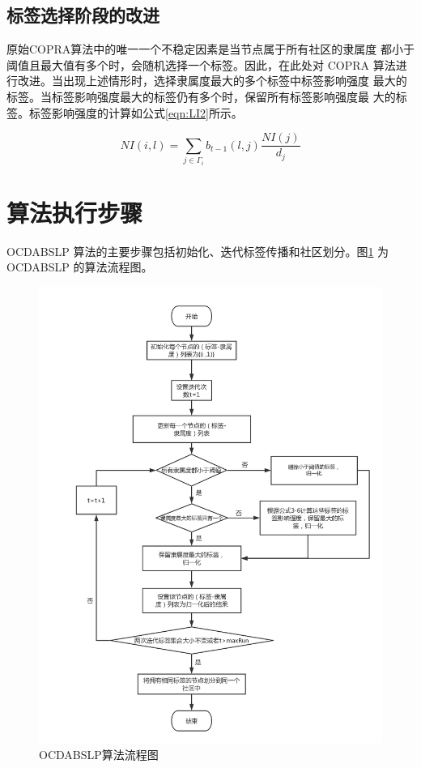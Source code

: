 \subsection{标签选择阶段的改进}
原始COPRA算法中的唯一一个不稳定因素是当节点属于所有社区的隶属度
都小于阈值且最大值有多个时，会随机选择一个标签。因此，在此处对 COPRA
算法进行改进。当出现上述情形时，选择隶属度最大的多个标签中标签影响强度
最大的标签。当标签影响强度最大的标签仍有多个时，保留所有标签影响强度最
大的标签。标签影响强度的计算如公式\ref{eqn:LI2}所示。

\begin{equation}
  \label{eqn:LI2}
  NI(i,l)=\sum_{j \in \Gamma _i} b_{t-1}(l,j) \frac{NI(j)}{d_j}
\end{equation}

\section{算法执行步骤}
OCDABSLP 算法的主要步骤包括初始化、迭代标签传播和社区划分。图\ref{fig:fig4-1}
为 OCDABSLP 的算法流程图。

\begin{figure}
  \centering
  \includegraphics[width=1\textwidth]{figures/fig4-1}
  \caption{OCDABSLP算法流程图}\label{fig:fig4-1}
\end{figure}

